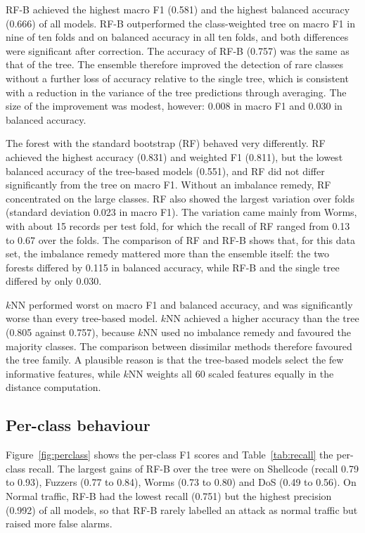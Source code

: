 \documentclass[conference,10pt]{IEEEtran}
\begin{document}
RF-B achieved the highest macro F1 (0.581) and the highest balanced accuracy (0.666) of all models. RF-B outperformed the class-weighted tree on macro F1 in nine of ten folds and on balanced accuracy in all ten folds, and both differences were significant after correction. The accuracy of RF-B (0.757) was the same as that of the tree. The ensemble therefore improved the detection of rare classes without a further loss of accuracy relative to the single tree, which is consistent with a reduction in the variance of the tree predictions through averaging. The size of the improvement was modest, however: 0.008 in macro F1 and 0.030 in balanced accuracy.

The forest with the standard bootstrap (RF) behaved very differently. RF achieved the highest accuracy (0.831) and weighted F1 (0.811), but the lowest balanced accuracy of the tree-based models (0.551), and RF did not differ significantly from the tree on macro F1. Without an imbalance remedy, RF concentrated on the large classes. RF also showed the largest variation over folds (standard deviation 0.023 in macro F1). The variation came mainly from Worms, with about 15 records per test fold, for which the recall of RF ranged from 0.13 to 0.67 over the folds. The comparison of RF and RF-B shows that, for this data set, the imbalance remedy mattered more than the ensemble itself: the two forests differed by 0.115 in balanced accuracy, while RF-B and the single tree differed by only 0.030.

$k$NN performed worst on macro F1 and balanced accuracy, and was significantly worse than every tree-based model. $k$NN achieved a higher accuracy than the tree (0.805 against 0.757), because $k$NN used no imbalance remedy and favoured the majority classes. The comparison between dissimilar methods therefore favoured the tree family. A plausible reason is that the tree-based models select the few informative features, while $k$NN weights all 60 scaled features equally in the distance computation.

\subsection{Per-class behaviour}
Figure~\ref{fig:perclass} shows the per-class F1 scores and Table~\ref{tab:recall} the per-class recall. The largest gains of RF-B over the tree were on Shellcode (recall 0.79 to 0.93), Fuzzers (0.77 to 0.84), Worms (0.73 to 0.80) and DoS (0.49 to 0.56). On Normal traffic, RF-B had the lowest recall (0.751) but the highest precision (0.992) of all models, so that RF-B rarely labelled an attack as normal traffic but raised more false alarms.
\end{document}
